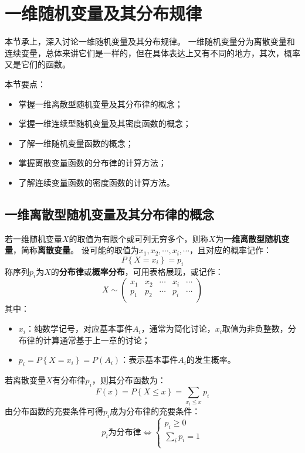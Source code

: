 \section{一维随机变量及其分布规律}

本节承上，深入讨论一维随机变量及其分布规律。
一维随机变量分为离散变量和连续变量，总体来讲它们是一样的，但在具体表达上又有不同的地方，其次，概率又是它们的函数。

本节要点：
\begin{itemize}
    \item 掌握一维离散型随机变量及其分布律的概念；
    \item 掌握一维连续型随机变量及其密度函数的概念；
    \item 了解一维随机变量函数的概念；
    \item 掌握离散变量函数的分布律的计算方法；
    \item 了解连续变量函数的密度函数的计算方法。
\end{itemize}


\subsection{一维离散型随机变量及其分布律的概念}

\begin{definition}[一维离散型随机变量]
若一维随机变量$X$的取值为有限个或可列无穷多个，则称$X$为{\bf 一维离散型随机变量}，简称{\bf 离散变量}。
设可能的取值为$x_1,x_2,\cdots ,x_i,\cdots $，且对应的概率记作：
\[
P\left\{ X=x_i \right\} =p_i
\]
称序列$p_i$为$X$的{\bf 分布律}或{\bf 概率分布}，可用表格展现，或记作：
\[
X\sim \left( \begin{matrix}
	x_1&		x_2&		\cdots&		x_i&		\cdots\\
	p_1&		p_2&		\cdots&		p_i&		\cdots\\
\end{matrix} \right)
\]
其中：
\begin{itemize}
    \item $x_i$：纯数学记号，对应基本事件$A_i$，通常为简化讨论，$x_i$取值为非负整数，分布律的计算通常基于上一章的讨论；
    \item $p_i=P\left\{ X=x_i \right\} =P\left( A_i \right) $：表示基本事件$A_i$的发生概率。
\end{itemize}
\end{definition}

若离散变量$X$有分布律$p_i$，则其分布函数为：
\[
F\left( x \right) =P\left\{ X\leqslant x \right\} =\sum_{x_i\leqslant x}{p_i}
\]
由分布函数的充要条件可得$p_i$成为分布律的充要条件：
\[
p_i\text{为分布律}\Leftrightarrow \begin{cases}
	p_i\geqslant 0\\
	\sum_i{p_i}=1\\
\end{cases}
\]


